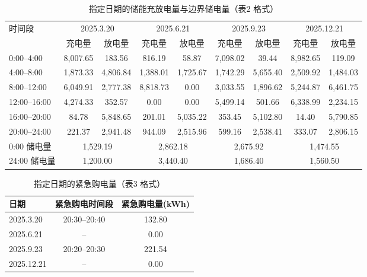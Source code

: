 \documentclass[zihao=-4,a4paper,UTF8,fontset=none]{ctexart}
\begin{document}
\begin{table}[H]
  \centering
  \caption{指定日期的储能充放电量与边界储电量（表2 格式）}
  \label{tab:q2_days2}
  \footnotesize
  \begin{tabular}{lcccccccc}
    \toprule
    \multirow{2}{*}{时间段} & \multicolumn{2}{c}{2025.3.20} & \multicolumn{2}{c}{2025.6.21} & \multicolumn{2}{c}{2025.9.23} & \multicolumn{2}{c}{2025.12.21} \\
    \cmidrule(lr){2-3}\cmidrule(lr){4-5}\cmidrule(lr){6-7}\cmidrule(lr){8-9}
    & 充电量 & 放电量 & 充电量 & 放电量 & 充电量 & 放电量 & 充电量 & 放电量 \\
    \midrule
    0:00--4:00   & 8,007.65 & 183.56 & 816.19 & 58.87 & 7,098.02 & 39.44 & 8,982.65 & 119.09 \\
    4:00--8:00   & 1,873.33 & 4,806.84 & 1,388.01 & 1,725.67 & 1,742.29 & 5,655.40 & 2,509.92 & 1,484.03 \\
    8:00--12:00  & 6,049.91 & 2,777.38 & 8,818.73 & 0.00 & 3,033.55 & 1,896.62 & 5,244.87 & 6,461.75 \\
    12:00--16:00 & 4,274.33 & 352.57 & 0.00 & 0.00 & 5,499.14 & 501.66 & 6,338.99 & 2,234.15 \\
    16:00--20:00 & 84.78 & 5,848.65 & 201.01 & 5,035.22 & 353.45 & 5,102.80 & 14.40 & 5,790.85 \\
    20:00--24:00 & 221.37 & 2,941.48 & 944.09 & 2,515.96 & 599.16 & 2,538.41 & 333.07 & 2,806.15 \\
    \midrule
    0:00 储电量   & \multicolumn{2}{c}{1,529.19} & \multicolumn{2}{c}{2,862.18} & \multicolumn{2}{c}{2,675.92} & \multicolumn{2}{c}{1,474.55} \\
    24:00 储电量  & \multicolumn{2}{c}{1,200.00} & \multicolumn{2}{c}{3,440.40} & \multicolumn{2}{c}{1,686.40} & \multicolumn{2}{c}{1,560.50} \\
    \bottomrule
  \end{tabular}
\end{table}

\begin{table}[H]
  \centering
  \caption{指定日期的紧急购电量（表3 格式）}
  \label{tab:q2_days3}
  \small
  \begin{tabular}{lcc}
    \toprule
    日期 & 紧急购电时间段 & 紧急购电量(kWh) \\
    \midrule
    2025.3.20  & 20:30--20:40 & 132.80 \\
    2025.6.21  & -- & 0.00 \\
    2025.9.23  & 20:20--20:30 & 221.54 \\
    2025.12.21 & -- & 0.00 \\
    \bottomrule
  \end{tabular}
\end{table}
\end{document}
